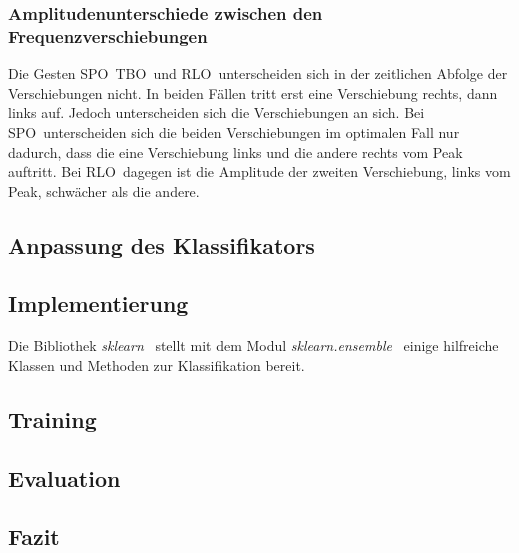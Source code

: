 \subsubsection*{Amplitudenunterschiede zwischen den Frequenzverschiebungen}
Die Gesten \glqq \acl{SPO}\grqq\, \glqq \acl{TBO}\grqq\ und \glqq \acl{RLO}\grqq\ unterscheiden sich in der zeitlichen Abfolge der Verschiebungen nicht. In beiden Fällen tritt erst eine Verschiebung rechts, dann links auf. Jedoch unterscheiden sich die Verschiebungen an sich. Bei \glqq \acl{SPO}\grqq\ unterscheiden sich die beiden Verschiebungen im optimalen Fall nur dadurch, dass die eine Verschiebung links und die andere rechts vom Peak auftritt. Bei \glqq \acl{RLO}\grqq\ dagegen ist die Amplitude der zweiten Verschiebung, links vom Peak, schwächer als die andere.

\subsection{Anpassung des Klassifikators}

\subsection{Implementierung}



Die Bibliothek \textit{sklearn}~\cite{sklearn} stellt mit dem Modul \textit{sklearn.ensemble}~\cite{sklearn.ensemble} einige hilfreiche Klassen und Methoden zur Klassifikation bereit.

\subsection{Training}

\subsection{Evaluation}

\subsection{Fazit}


